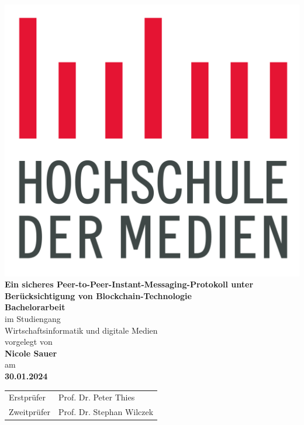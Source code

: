 \documentclass[12pt, a4paper]{report}
\begin{document}
    \begin{titlepage}
        \begin{center}
            \includegraphics[width=0.3\linewidth]{images/hdm_logo.png} \\
            \vspace*{2cm}
            \Huge
            \textbf{Ein sicheres Peer-to-Peer-Instant-Messaging-Protokoll unter
            Berücksichtigung von Blockchain-Technologie}\\

            \vspace*{1cm}
            \Large 
            \textbf{Bachelorarbeit}\\
            \bigbreak
            im Studiengang \\
            Wirtschaftsinformatik und digitale Medien\\
            \vspace*{1cm}
            \large 
            vorgelegt von \\
            \vspace*{0.5cm}
            \textbf{Nicole Sauer} \\
            \vspace*{0.2cm}
            am \\
            \vspace*{0.2cm}
            \textbf{30.01.2024} \\
            \vspace*{1.3cm}
            \large 
            \begin{tabular}{ll}
                Erstprüfer & Prof. Dr. Peter Thies \\
                Zweitprüfer & Prof. Dr. Stephan Wilczek \\
            \end{tabular} \\
        \end{center}
    \end{titlepage}

    \tableofcontents
    
    
    
    



    \printbibliography[type=online,title={Webseiten}]
    \printbibliography[nottype=online, title={Bücher und Dokumente}]
\end{document}
